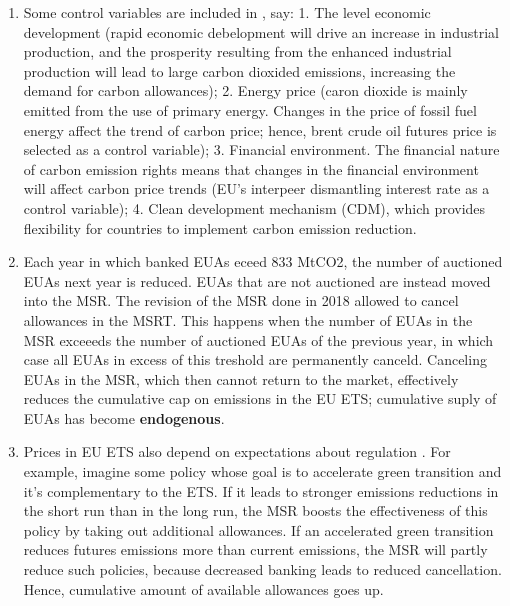 \begin{enumerate}[wide, itemsep=0cm, topsep=0cm, label=\textbf{\arabic{enumi}.}]
	\item Some control variables are included in \cite{dong2022exploring}, say: 1. The level economic development (rapid economic debelopment will drive an increase in industrial production, and the prosperity resulting from the enhanced industrial production will lead to large carbon dioxided emissions, increasing the demand for carbon allowances); 2. Energy price (caron dioxide is mainly emitted from the use of primary energy. Changes in the price of fossil fuel energy affect the trend of carbon price; hence,  brent crude oil futures price is selected as a control variable); 3. Financial environment. The financial nature of carbon emission rights means that changes in the financial environment will affect carbon price trends (EU's interpeer dismantling interest rate as a control variable); 4. Clean development mechanism (CDM), which provides flexibility for countries to implement carbon emission reduction.
	
	\item Each year in which banked EUAs eceed 833 MtCO2, the number of auctioned EUAs next year is reduced. EUAs that are not auctioned are instead moved into the MSR. The revision of the MSR done in 2018 allowed to cancel allowances in the MSRT. This happens when the number of EUAs in the MSR exceeeds the number of auctioned EUAs of the previous year, in which case all EUAs in excess of this treshold are permanently canceld. Canceling EUAs in the MSR, which then cannot return to the market, effectively reduces the cumulative cap on emissions in the EU ETS; cumulative suply of EUAs has become \textbf{endogenous}. \cite{gerlagh2020covid}
	
	\item Prices in EU ETS also depend on expectations about regulation \cite{gerlagh2020covid}. For example, imagine some policy whose goal is to accelerate green transition and it's complementary to the ETS. If it leads to stronger emissions reductions in the short run than in the long run, the MSR boosts the effectiveness of this policy by taking out additional allowances. If an accelerated green transition reduces futures emissions more than current emissions, the MSR will partly reduce such policies, because decreased banking leads to reduced cancellation. Hence, cumulative amount of available allowances goes up.
	

\end{enumerate}
